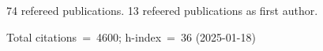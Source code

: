 74 refereed publications. 13 refeered publications as first author.

Total citations~=~4600; h-index~=~36 (2025-01-18)